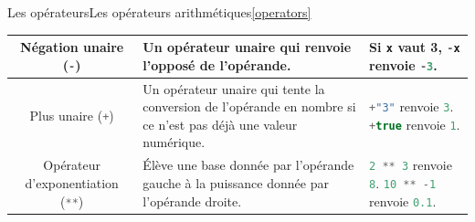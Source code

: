 \documentclass{beamer}
\begin{document}
\begin{frame}{Les opérateurs}{Les opérateurs arithmétiques\cref{operators}}
\begin{tiny}
\begin{table}[h!]
\begin{tabular}{|c|p{4cm}|p{4cm}|}
                    \hline
                    Négation unaire (\lstinline[language=Javascript]!-!)             & Un opérateur unaire qui renvoie l'opposé de l'opérande.                                                                                                                                                                                                                                                                             & Si \lstinline[language=Javascript]!x! vaut 3, \lstinline[language=Javascript]!-x! renvoie \lstinline[language=Javascript]!-3!.                                                                                                                                                                                                                                                                                                                                    \\
                    \hline
                    Plus unaire (\lstinline[language=Javascript]!+!)                 & Un opérateur unaire qui tente la conversion de l'opérande en nombre si ce n'est pas déjà une valeur numérique.                                                                                                                                                                                                                      & \lstinline[language=Javascript]!+"3"! renvoie \lstinline[language=Javascript]!3!. \newline \lstinline[language=Javascript]!+true! renvoie \lstinline[language=Javascript]!1!.                                                                                                                                                                                                                                                                                     \\
                    \hline
                    Opérateur d'exponentiation (\lstinline[language=Javascript]!**!) & Élève une base donnée par l'opérande gauche à la puissance donnée par l'opérande droite.                                                                                                                                                                                                                                            & \lstinline[language=Javascript]!2 ** 3! renvoie \lstinline[language=Javascript]!8!. \newline \lstinline[language=Javascript]!10 ** -1! renvoie \lstinline[language=Javascript]!0.1!.                                                                                                                                                                                                                                                                              \\
                    \hline
                \end{tabular}
            \end{table}
        \end{tiny}
    \end{frame}
\end{document}

